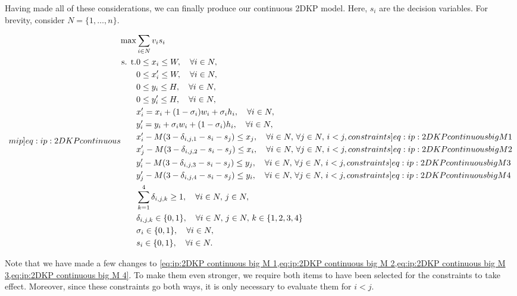 Having made all of these considerations, we can finally produce our continuous 2DKP model. Here, $s_i$ are the decision variables. For brevity, consider $N = \{1,\dots,n\}$.

\begin{subequations}
    \label[mip]{eq:ip:2DKP continuous}
    \begin{align}
        \max&\sum_{i \in N}v_i s_i\\
        \text{s. t.}& 0 \leq x_i \leq W, \quad \forall i \in N,\\
        & 0 \leq x'_i \leq W, \quad \forall i \in N,\\
        & 0 \leq y_i \leq H, \quad \forall i \in N,\\
        & 0 \leq y'_i \leq H, \quad \forall i \in N,\\
        & x'_i = x_i + (1 - \sigma_i)w_i + \sigma_i h_i, \quad \forall i \in N,\\
        & y'_i = y_i + \sigma_i w_i + (1 - \sigma_i)h_i, \quad \forall i \in N,\\
        & x'_i - M(3 - \delta_{i,j,1} - s_i - s_j) \leq x_j, \quad \forall i \in N, \, \forall j \in N, \, i < j, \label[constraints]{eq:ip:2DKP continuous big M 1}\\
        & x'_j - M(3 - \delta_{i,j,2} - s_i - s_j) \leq x_i, \quad \forall i \in N, \, \forall j \in N, \, i < j, \label[constraints]{eq:ip:2DKP continuous big M 2}\\
        & y'_i - M(3 - \delta_{i,j,3} - s_i - s_j) \leq y_j, \quad \forall i \in N, \, \forall j \in N, \, i < j, \label[constraints]{eq:ip:2DKP continuous big M 3}\\
        & y'_j - M(3 - \delta_{i,j,4} - s_i - s_j) \leq y_i, \quad \forall i \in N, \, \forall j \in N, \, i < j, \label[constraints]{eq:ip:2DKP continuous big M 4}\\
        & \sum_{k=1}^{4} \delta_{i,j,k} \geq 1, \quad \forall i \in N, \, j \in N,\\
        & \delta_{i,j,k} \in \{0,1\}, \quad \forall i \in N, \, j \in N, \, k \in \{1,2,3,4\}\\
        & \sigma_i \in \{0,1\}, \quad \forall i \in N,\\ 
        & s_i \in \{0,1\}, \quad \forall i \in N.
    \end{align}
\end{subequations}

Note that we have made a few changes to \cref{eq:ip:2DKP continuous big M 1,eq:ip:2DKP continuous big M 2,eq:ip:2DKP continuous big M 3,eq:ip:2DKP continuous big M 4}. To make them even stronger, we require both items to have been selected for the constraints to take effect. Moreover, since these constraints go both ways, it is only necessary to evaluate them for $i < j$.

